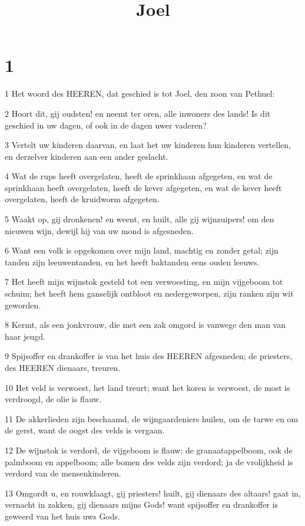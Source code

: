 

\title{Joel}



\chapter{1}

\par 1 Het woord des HEEREN, dat geschied is tot Joel, den zoon van Pethuel:
\par 2 Hoort dit, gij oudsten! en neemt ter oren, alle inwoners des lands! Is dit geschied in uw dagen, of ook in de dagen uwer vaderen?
\par 3 Vertelt uw kinderen daarvan, en laat het uw kinderen hun kinderen vertellen, en derzelver kinderen aan een ander geslacht.
\par 4 Wat de rups heeft overgelaten, heeft de sprinkhaan afgegeten, en wat de sprinkhaan heeft overgelaten, heeft de kever afgegeten, en wat de kever heeft overgelaten, heeft de kruidworm afgegeten.
\par 5 Waakt op, gij dronkenen! en weent, en huilt, alle gij wijnzuipers! om den nieuwen wijn, dewijl hij van uw mond is afgesneden.
\par 6 Want een volk is opgekomen over mijn land, machtig en zonder getal; zijn tanden zijn leeuwentanden, en het heeft baktanden eens ouden leeuws.
\par 7 Het heeft mijn wijnstok gesteld tot een verwoesting, en mijn vijgeboom tot schuim; het heeft hem ganselijk ontbloot en nedergeworpen, zijn ranken zijn wit geworden.
\par 8 Kermt, als een jonkvrouw, die met een zak omgord is vanwege den man van haar jeugd.
\par 9 Spijsoffer en drankoffer is van het huis des HEEREN afgesneden; de priesters, des HEEREN dienaars, treuren.
\par 10 Het veld is verwoest, het land treurt; want het koren is verwoest, de most is verdroogd, de olie is flauw.
\par 11 De akkerlieden zijn beschaamd, de wijngaardeniers huilen, om de tarwe en om de gerst, want de oogst des velds is vergaan.
\par 12 De wijnstok is verdord, de vijgeboom is flauw; de granaatappelboom, ook de palmboom en appelboom; alle bomen des velds zijn verdord; ja de vrolijkheid is verdord van de mensenkinderen.
\par 13 Omgordt u, en rouwklaagt, gij priesters! huilt, gij dienaars des altaars! gaat in, vernacht in zakken, gij dienaars mijns Gods! want spijsoffer en drankoffer is geweerd van het huis uws Gods.
